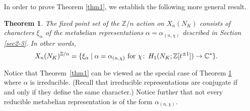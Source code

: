 \documentclass[12pt]{amsart}
\theoremstyle{plain}
\newtheorem{thm}{Theorem}
\theoremstyle{remark}
\begin{document}
In order to prove Theorem \ref{thm1}, we establish the following more
general result.
\begin{thm} \label{thm4}
The fixed point set  of the ${{\mathbb Z}}/n$ action on $X_n(N_K)$
consists of characters $\xi_{\alpha}$ of the metabelian representations
${\alpha} = {\alpha}_{(n,\chi)}$ described in Section \ref{sec2-3}. In other words,
$$X_n(N_K)^{{{\mathbb Z}}/n} = \{ \xi_{\alpha} \mid {\alpha} ={\alpha}_{(n,\chi)} \text{ for } \chi {\colon\thinspace} H_1(N_K; {{\mathbb Z}}[t^{\pm 1}]) \to {{\mathbb C}}^*\}.$$
\end{thm}

Notice that Theorem~\ref{thm1} can be viewed as the
special case of Theorem \ref{thm4} where
${\alpha}$ is irreducible. (Recall that irreducible representations are conjugate if and only if they define the same character.)
Notice further that not every reducible metabelian
representation is of the form ${\alpha}_{(n,\chi)}$.
\end{document}
